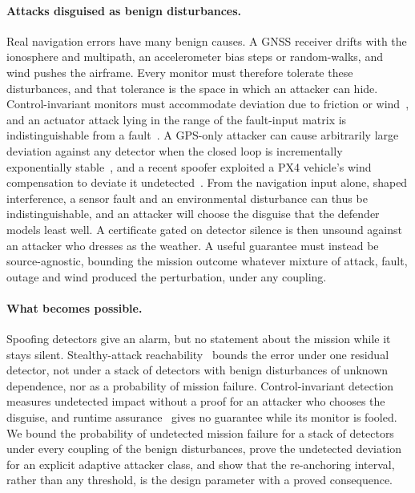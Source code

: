 \documentclass[letterpaper,twocolumn,10pt]{article}
\theoremstyle{remark}
\begin{document}
\paragraph{Attacks disguised as benign disturbances.}
Real navigation errors have many benign causes. A GNSS receiver drifts with
the ionosphere and multipath, an accelerometer bias steps or random-walks, and
wind pushes the airframe. Every monitor must therefore tolerate these
disturbances, and that tolerance is the space in which an attacker can hide.
Control-invariant monitors must accommodate deviation due to friction or
wind~\cite{dash2019}, and an actuator attack lying in the range of the
fault-input matrix is indistinguishable from a fault~\cite{roy2023}. A
GPS-only attacker can cause arbitrarily large deviation against any detector
when the closed loop is incrementally exponentially
stable~\cite{khazraei2024}, and a recent spoofer exploited a PX4 vehicle's
wind compensation to deviate it undetected~\cite{kim2024predictable}. From the
navigation input alone, shaped interference, a sensor fault and an
environmental disturbance can thus be indistinguishable, and an attacker will
choose the disguise that the defender models least well. A certificate gated on
detector silence is then unsound against an attacker who dresses as the
weather. A useful guarantee must instead be source-agnostic, bounding the
mission outcome whatever mixture of attack, fault, outage and wind produced the
perturbation, under any coupling.

\paragraph{What becomes possible.}
Spoofing detectors give an alarm, but no statement about the mission while it
stays silent. Stealthy-attack reachability~\cite{mo2016,urbina2016} bounds the
error under one residual detector, not under a stack of detectors with benign
disturbances of unknown dependence, nor as a probability of mission failure.
Control-invariant detection~\cite{choi2018,quinonez2020savior} measures
undetected impact without a proof for an attacker who chooses the disguise, and
runtime assurance~\cite{sha2001} gives no guarantee while its monitor is fooled. We bound the
probability of undetected mission failure for a stack of detectors under every
coupling of the benign disturbances, prove the undetected deviation for an
explicit adaptive attacker class, and show that the re-anchoring interval,
rather than any threshold, is the design parameter with a proved consequence.
\end{document}
